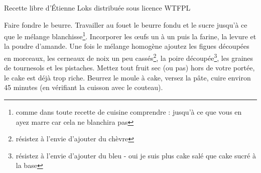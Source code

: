 \documentclass[a4paper]{recipe}
\begin{document}
Recette libre d'Étienne Loks distribuée sous licence WTFPL

Faire fondre le beurre. Travailler au fouet le beurre fondu et le sucre
jusqu'à ce que le mélange blanchisse\footnote{comme dans toute recette
de cuisine comprendre : jusqu'à ce que vous en ayez marre car cela ne
blanchira pas}. Incorporer les \oe ufs un à un puis la farine, la
levure et la poudre d'amande. Une fois le mélange homogène ajoutez les
figues découpées en morceaux, les cerneaux de noix un peu cassés\footnote{
résistez à l'envie d'ajouter du chèvre}, la poire découpée\footnote{
résistez à l'envie d'ajouter du bleu - oui je suis plus
cake salé que cake sucré à la base}, les graines de tournesols et les
pistaches. Mettez tout fruit sec (ou pas) hors de votre portée, le
cake est déjà trop riche. Beurrez le moule à cake, versez la pâte,
cuire environ 45 minutes (en vérifiant la cuisson avec le couteau).
\end{document}
